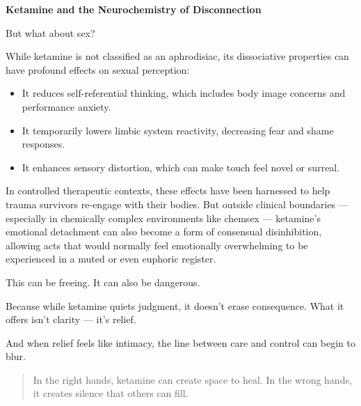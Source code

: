 \begin{TechnicalSidebar}{\textbf{Ketamine and the Neurochemistry of Disconnection}}
  \medskip
  
  But what about sex?

  \medskip
  
  While ketamine is not classified as an aphrodisiac, its dissociative properties can have profound effects 
  on sexual perception:

  \medskip
  
  \begin{itemize}
  \item It reduces self-referential thinking, which includes body image concerns and performance anxiety.
  \item It temporarily lowers limbic system reactivity, decreasing fear and shame responses.
  \item It enhances sensory distortion, which can make touch feel novel or surreal.
  \end{itemize}

  \medskip
  
  In controlled therapeutic contexts, these effects have been harnessed to help trauma survivors re-engage 
  with their bodies. But outside clinical boundaries — especially in chemically complex environments like 
  chemsex — ketamine’s emotional detachment can also become a form of consensual disinhibition, allowing 
  acts that would normally feel emotionally overwhelming to be experienced in a muted or even euphoric 
  register.
  
  \medskip
  
  This can be freeing.
  It can also be dangerous.

  \medskip
  
  Because while ketamine quiets judgment, it doesn’t erase consequence. What it offers isn’t clarity 
  — it’s relief.

  \medskip
  
  And when relief feels like intimacy, the line between care and control can begin to blur.
  
  \begin{quote}
    In the right hands, ketamine can create space to heal.  
    In the wrong hands, it creates silence that others can fill.
  \end{quote}
  
\end{TechnicalSidebar}
